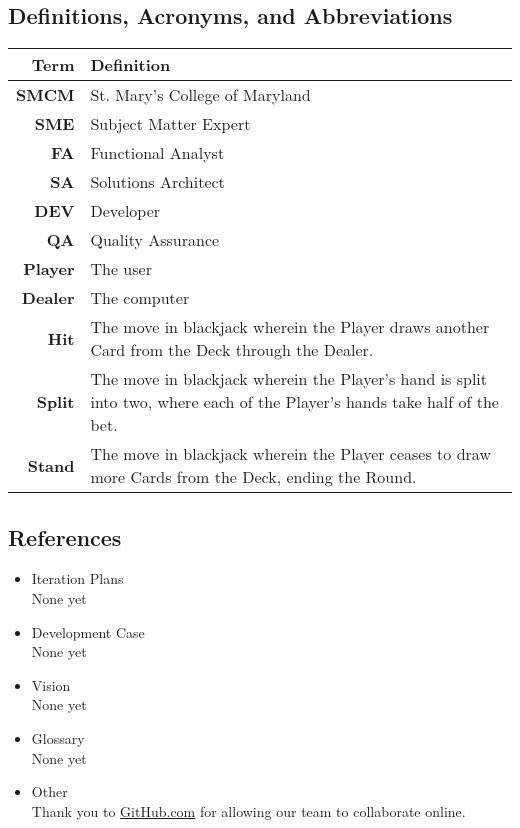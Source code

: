 \documentclass[12pt]{article}
\begin{document}
\subsection{Definitions, Acronyms, and Abbreviations}
\begin{table}[h]
\begin{tabularx}{\linewidth}{|r|X|}
\hline 
\textbf{Term} & Definition \\ \hline 
\textbf{SMCM} & St. Mary's College of Maryland \\ \hline 
\textbf{SME} & Subject Matter Expert \\ \hline 
\textbf{FA} & Functional Analyst \\ \hline 
\textbf{SA} & Solutions Architect \\ \hline 
\textbf{DEV} & Developer \\ \hline 
\textbf{QA} & Quality Assurance \\ \hline 
\textbf{Player} & The user \\ \hline 
\textbf{Dealer} & The computer \\ \hline 
\textbf{Hit} & The move in blackjack wherein the Player draws another Card from
the Deck through the Dealer. \\ \hline 
\textbf{Split} & The move in blackjack wherein the Player's hand is split into
two, where each of the Player's hands take half of the bet. \\ \hline 
\textbf{Stand} & The move in blackjack wherein the Player ceases to draw more
Cards from the Deck, ending the Round. \\ \hline 
\end{tabularx}
\end{table}


\subsection{References}
\begin{itemize}
\item Iteration Plans \\ None yet
\item Development Case \\ None yet
\item Vision \\ None yet
\item Glossary \\ None yet
\item Other \\ Thank you to \href{http://www.github.com}{GitHub.com} for allowing our team to collaborate
online.
\end{itemize}
\end{document}
